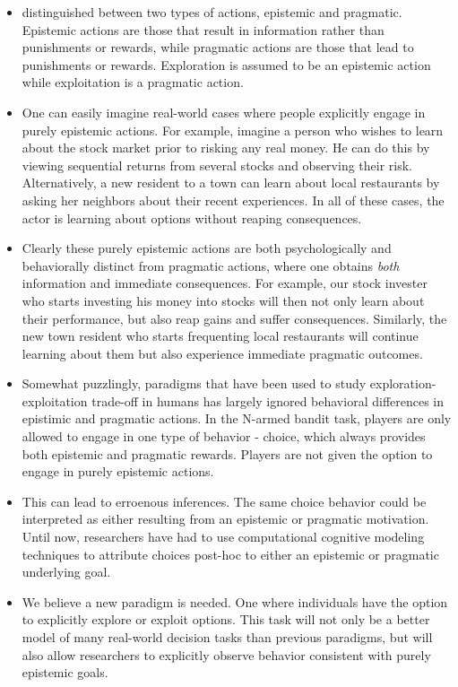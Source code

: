 \documentclass[a4paper,doc,natbib,floatsintext]{apa6}\usepackage[]{graphicx}\usepackage[]{color}
\begin{document}
\begin{itemize}

  \item \cite{neth2008thinking} distinguished between two types of actions, epistemic and pragmatic. Epistemic actions are those that result in information rather than punishments or rewards, while pragmatic actions are those that lead to punishments or rewards. Exploration is assumed to be an epistemic action while exploitation is a pragmatic action.
  
  \item One can easily imagine real-world cases where people explicitly engage in purely epistemic actions. For example, imagine a person who wishes to learn about the stock market prior to risking any real money. He can do this by viewing sequential returns from several stocks and observing their risk. Alternatively, a new resident to a town can learn about local restaurants by asking her neighbors about their recent experiences. In all of these cases, the actor is learning about options without reaping consequences.
  
  \item Clearly these purely epistemic actions are both psychologically and behaviorally distinct from pragmatic actions, where one obtains \textit{both} information and immediate consequences. For example, our stock invester who starts investing his money into stocks will then not only learn about their performance, but also reap gains and suffer consequences. Similarly, the new town resident who starts frequenting local restaurants will continue learning about them but also experience immediate pragmatic outcomes.
  
  \item Somewhat puzzlingly, paradigms that have been used to study exploration-exploitation trade-off in humans has largely ignored behavioral differences in epistimic and pragmatic actions. In the N-armed bandit task, players are only allowed to engage in one type of behavior - choice, which always provides both epistemic and pragmatic rewards. Players are not given the option to engage in purely epistemic actions. 
  
  \item This can lead to erroenous inferences. The same choice behavior could be interpreted as either resulting from an epistemic or pragmatic motivation. Until now, researchers have had to use computational cognitive modeling techniques to attribute choices post-hoc to either an epistemic or pragmatic underlying goal.
  
  \item We believe a new paradigm is needed. One where individuals have the option to explicitly explore or exploit options. This task will not only be a better model of many real-world decision tasks than previous paradigms, but will also allow researchers to explicitly observe behavior consistent with purely epistemic goals.

\end{itemize}
\end{document}
